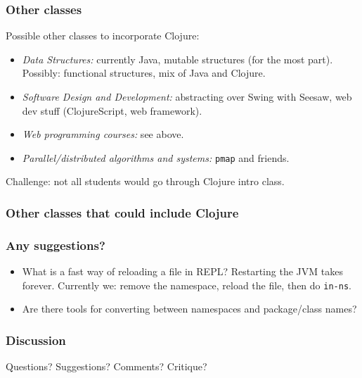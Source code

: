 \documentclass{beamer}
\begin{document}
\begin{frame}
  \frametitle{Other classes}
Possible other classes to incorporate Clojure:
\begin{itemize}
\item {\it Data Structures:} currently Java, mutable structures (for the most part). Possibly: functional structures, mix of Java and Clojure. 
\item  {\it Software Design and Development:} abstracting over Swing with Seesaw, web dev stuff (ClojureScript, web framework). 
\item {\it Web programming courses:} see above. 
\item {\it Parallel/distributed algorithms and systems:} {\tt pmap} and friends. 
\end{itemize}
Challenge: not all students would go through Clojure intro class. 
\end{frame}

\begin{frame}
  \frametitle{Other classes that could include Clojure}
{\small
{}
}
\end{frame}

\begin{frame}
  \frametitle{Any suggestions?}
\begin{itemize}
\item What is a fast way of reloading a file in REPL? Restarting the JVM takes forever. Currently we: remove the namespace, reload the file, then do {\tt in-ns}.
\item Are there tools for converting between namespaces and package/class names? 
\end{itemize}
\end{frame}

\begin{frame}
  \frametitle{Discussion}
Questions? Suggestions? Comments? Critique? 
\end{frame}
\end{document}
